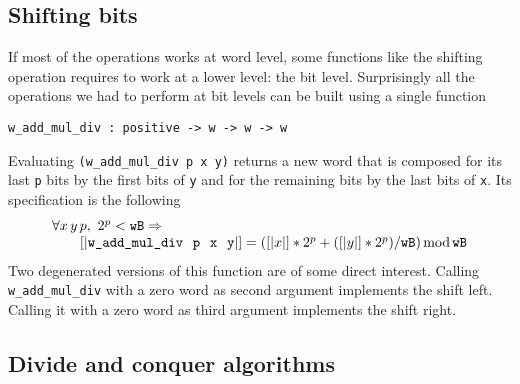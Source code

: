 \subsection{Shifting bits}

If most of the operations works at word level, some functions like the
shifting operation requires to work at a lower level: the bit level.
Surprisingly all the operations we had to perform at bit levels can be built
using a single function
\begin{verbatim}
w_add_mul_div : positive -> w -> w -> w
\end{verbatim}
Evaluating  {\tt (w\_add\_mul\_div p x y)} returns a new word that
is composed for its last {\tt p} bits by the first bits of {\tt y}
and for the remaining bits by the last bits of {\tt x}.
Its specification is the following
$$\begin{array}{l}
\forall x\, y\, p, \,\, 2 ^ p < {\texttt{wB}}  \Rightarrow \\
\hskip20pt [|\textit{\tt{w\_add\_mul\_div}\, p\, x\, y}|] = ([|x|] * 2 ^ p + ([|y|] * 2 ^ p) / {\texttt{wB}}) \,\mbox{mod}\, {\texttt{wB}}
\end{array}
$$
Two degenerated versions of this function are of some direct interest. Calling
{\tt w\_add\_mul\_div} with a zero word as second argument implements
the shift left. Calling it with a zero word as third argument implements
the shift right.

\subsection{Divide and conquer algorithms}

